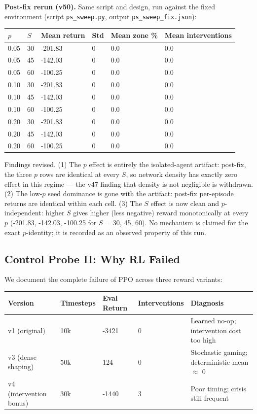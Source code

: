 \documentclass[11pt]{article}
\begin{document}
\textbf{Post-fix rerun (v50).} Same script and design, run against the fixed environment (script \texttt{ps\_sweep.py}, output \texttt{ps\_sweep\_fix.json}):

\begin{table}[htbp]
\centering
\begin{tabular}{llllll}
\toprule
\textbf{$p$} & \textbf{$S$} & \textbf{Mean return} & \textbf{Std} & \textbf{Mean zone \%} & \textbf{Mean interventions} \\
\midrule
0.05 & 30 & -201.83 & 0 & 0.0 & 0.0 \\
0.05 & 45 & -142.03 & 0 & 0.0 & 0.0 \\
0.05 & 60 & -100.25 & 0 & 0.0 & 0.0 \\
0.10 & 30 & -201.83 & 0 & 0.0 & 0.0 \\
0.10 & 45 & -142.03 & 0 & 0.0 & 0.0 \\
0.10 & 60 & -100.25 & 0 & 0.0 & 0.0 \\
0.20 & 30 & -201.83 & 0 & 0.0 & 0.0 \\
0.20 & 45 & -142.03 & 0 & 0.0 & 0.0 \\
0.20 & 60 & -100.25 & 0 & 0.0 & 0.0 \\
\bottomrule
\end{tabular}
\end{table}

Findings revised. (1) The $p$ effect is entirely the isolated-agent artifact: post-fix, the three $p$ rows are identical at every $S$, so network density has exactly zero effect in this regime --- the v47 finding that density is not negligible is withdrawn. (2) The low-$p$ seed dominance is gone with the artifact: post-fix per-episode returns are identical within each cell. (3) The $S$ effect is now clean and $p$-independent: higher $S$ gives higher (less negative) reward monotonically at every $p$ (-201.83, -142.03, -100.25 for $S$ = 30, 45, 60). No mechanism is claimed for the exact $p$-identity; it is recorded as an observed property of this run.

\subsection{Control Probe II: Why RL Failed}
We document the complete failure of PPO across three reward variants:

\begin{table}[htbp]
\centering
\begin{tabular}{lllll}
\toprule
\textbf{Version} & \textbf{Timesteps} & \textbf{Eval Return} & \textbf{Interventions} & \textbf{Diagnosis} \\
\midrule
v1 (original) & 10k & -3421 & 0 & Learned no-op; intervention cost too high \\
v3 (dense shaping) & 50k & 124 & 0 & Stochastic gaming; deterministic mean $\approx$ 0 \\
v4 (intervention bonus) & 30k & -1440 & 3 & Poor timing; crisis still frequent \\
\bottomrule
\end{tabular}
\end{table}
\end{document}
